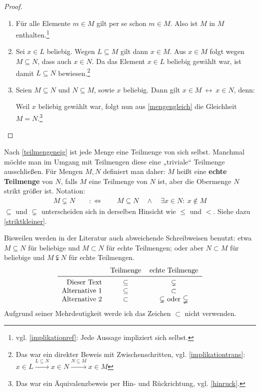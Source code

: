 \begin{proof}
    \begin{enumerate}
        \item Für alle Elemente $m\in M$ gilt per se schon $m\in M$. Also ist $M$ in $M$ enthalten.\footnote{vgl. \cref{implikationref}: Jede Aussage impliziert sich selbst.}
        \item Sei $x\in L$ beliebig. Wegen $L\subseteq M$ gilt dann $x\in M$. Aus $x\in M$ folgt wegen $M\subseteq N$, dass auch $x\in N$. Da das Element $x\in L$ beliebig gewählt war, ist damit $L\subseteq N$ bewiesen.\footnote{Das war ein direkter Beweis mit Zwischenschritten, vgl. \cref{implikationtrans}: $x\in L\xrightarrow{L\subseteq N} x\in N \xrightarrow{N\subseteq M} x\in M$}
        \item Seien $M\subseteq N$ und $N\subseteq M$, sowie $x$ beliebig. Dann gilt $x\in M\ \leftrightarrow\ x\in N$, denn:
        Weil $x$ beliebig gewählt war, folgt nun aus \cref{mengengleich} die Gleichheit $M=N$.\footnote{Das war ein Äquivalenzbeweis per Hin- und Rückrichtung, vgl. \cref{hinruck}.} \qedhere
    \end{enumerate}
\end{proof}


\begin{nota}
    Nach \cref{teilmengeneig} ist jede Menge eine Teilmenge von sich selbst. Manchmal möchte man im Umgang mit Teilmengen diese eine „triviale“ Teilmenge ausschließen. Für Mengen $M,N$ definiert man daher: $M$ heißt eine \textbf{echte Teilmenge} von $N$, falls $M$ eine Teilmenge von $N$ ist, aber die Obermenge $N$ strikt größer ist. Notation:
    \begin{align*}
        M\subsetneq N \qquad:\Leftrightarrow\qquad M\subseteq N\quad \land\quad \exists x\in N:\ x\notin M
    \end{align*}
    $\subseteq$ und $\subsetneq$ unterscheiden sich in derselben Hinsicht wie $\le$ und $<$. Siehe dazu \cref{striktkleiner}.

    Bisweilen werden in der Literatur auch abweichende Schreibweisen benutzt: etwa $M\subseteq N$ für beliebige und $M\subset N$ für echte Teilmengen; oder aber $N\subset M$ für beliebige und $M\subsetneqq N$ für echte Teilmengen.
    \[\begin{tabular}{rccc}
        & Teilmenge & echte Teilmenge \\ \midrule
        Dieser Text & $\subseteq$ & $\subsetneq$ \\
        Alternative 1 & $\subseteq$ & $\subset$ \\
        Alternative 2 & $\subset$ & $\subsetneq$ oder $\subsetneqq$
    \end{tabular}\]
    Aufgrund seiner Mehrdeutigkeit werde ich das Zeichen $\subset$ nicht verwenden.
\end{nota}


